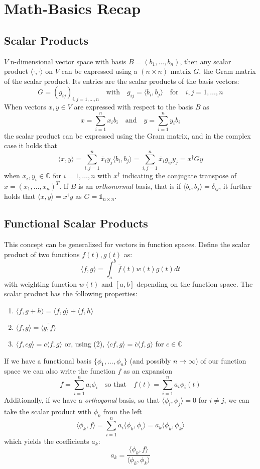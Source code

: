 \section{Math-Basics Recap}
\subsection{Scalar Products}
$V$ n-dimensional vector space with basis $B = (b_1, \dots, b_n)$, then any scalar product $\langle\cdot,\cdot\rangle$ on $V$ can be expressed using a $(n \times n)$ matrix $G$, the Gram matrix of the scalar product. Its entries are the scalar products of the basis vectors:
$$ G = (g_{ij})_{i,j=1,\dots,n} \quad \text{with} 
  \quad g_{ij} = \langle b_i, b_j \rangle \quad \text{for}
  \quad i,j = 1,\dots, n $$
When vectors $x,y \in V$ are expressed with respect to the basis $B$ as
$$ x = \sum_{i=1}^n x_i b_i \quad \text{and} \quad y = \sum_{i=1}^n y_i b_i $$
the scalar product can be expressed using the Gram matrix, and in the complex case it holds that
$$ \langle x, y \rangle = \sum^n_{i,j=1} \bar{x}_i y_j \langle b_i, b_j \rangle 
  =\sum^n_{i,j=1} \bar{x}_i g_{ij} y_j = x^\dagger G y$$
when $x_i,y_i \in \mathbb{C}$ for $i=1,\dots,n$ with $x^\dagger$ indicating the conjugate transpose of $x = (x_1, \dots, x_n)^T$. If $B$ is an \textit{orthonormal} basis, that is if $\langle b_i, b_j \rangle = \delta_{ij}$, it further holds that $\langle x,y \rangle = x^\dagger y$ as $G = \mathbb{1}_{n \times n}$.


\subsection{Functional Scalar Products}
This concept can be generalized for vectors in function spaces. Define the scalar product of two functions $f(t), g(t)$ as:
$$ \langle f, g \rangle = \int_a^b \bar{f}(t) w(t) g(t) dt $$
with weighting function $w(t)$ and $[a,b]$ depending on the function space. The scalar product has the following properties:
\begin{enumerate}
    \item $\langle f, g + h \rangle = \langle f,g \rangle + \langle f,h \rangle$
    \item $\langle f, g \rangle = \overline{\langle g, f \rangle}$
    \item $\langle f, cg \rangle = c \langle f,g \rangle$ or, using (2),
        $\langle cf,g \rangle = \bar{c} \langle f,g \rangle$ for $c \in \mathbb{C}$
\end{enumerate}
If we have a functional basis $\{\phi_1, \dots , \phi_n\}$ (and possibly $n \to \infty$) of our function space we can also write the function $f$ as an expansion
$$ f = \sum_{i=1}^n a_i \phi_i \quad \text{so that} \quad
  f(t) = \sum_{i=1}^n a_i \phi_i (t)$$
Additionally, if we have a \textit{orthogonal} basis, so that $\langle \phi_i, \phi_j \rangle = 0$ for $i \neq j$, we can take the scalar product with $\phi_k$ from the left
$$ \langle \phi_k, f \rangle = \sum_{i=1}^n a_i \langle \phi_k, \phi_i \rangle =
  a_k \langle \phi_k, \phi_k \rangle $$
which yields the coefficients $a_k$: 
$$ a_k = \frac{\langle \phi_k, f \rangle}{\langle \phi_k, \phi_k \rangle}$$

